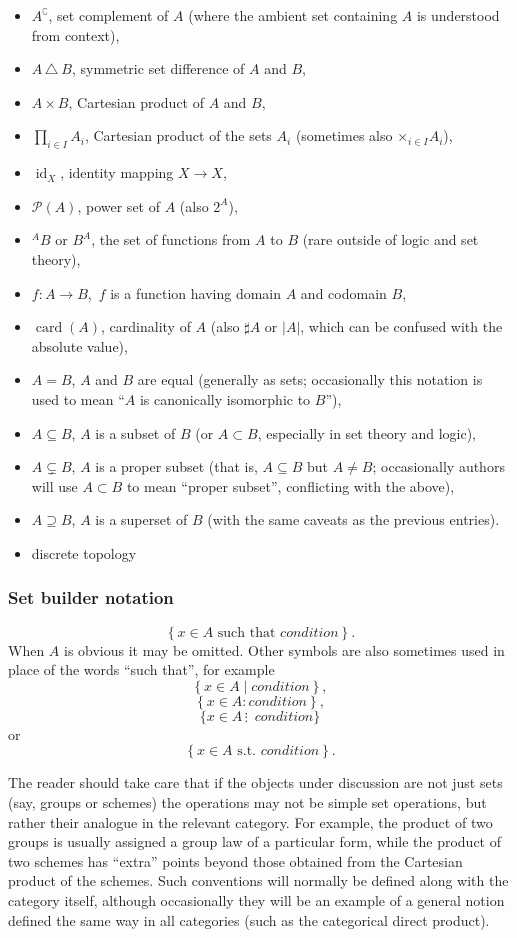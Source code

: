 \documentclass[12pt]{article}
\begin{document}
\begin{itemize}
\item $A^\complement$, set complement of $A$ (where the ambient 
set containing $A$ is understood from context),
\item $A\,\triangle\ B$, symmetric set difference of $A$ and $B$,
\item $A\times B$, Cartesian product of $A$ and $B$,
\item $\prod_{i \in I}A_i$, Cartesian product of the sets $A_i$ (sometimes also {\LARGE $\times$}$_{i \in I}A_i$),
\item $\operatorname{id}_X$, identity mapping $X\to X$,
\item $\mathcal{P}(A)$, power set of $A$ (also $2^{A}$),
\item $^AB$ or $B^A$, the set of functions from $A$ to $B$ (rare outside of logic and set theory),
\item $f\colon A\to B$,\, $f$ is a function having domain $A$ and codomain $B$, 
\item $\operatorname{card}(A)$, cardinality of $A$ (also $\sharp A$ or $\left|A\right|$, which can be confused with the absolute value),
\item $A = B$, $A$ and $B$ are equal (generally as sets; occasionally this notation is used to mean ``$A$ is canonically isomorphic to $B$''),
\item $A \subseteq B$, $A$ is a subset of $B$ (or $A\subset B$, especially in set theory and logic),
\item $A \subsetneq B$, $A$ is a proper subset (that is, $A\subseteq B$ but $A\neq B$; occasionally authors will use $A\subset B$ to mean ``proper subset'', conflicting with the above),
\item $A \supseteq B$, $A$ is a superset of $B$ (with the same caveats as the previous entries).
\item discrete topology
\end{itemize}

\subsubsection*{Set builder notation}
\[
\left\{ x\in A \text{ such that }\textit{condition} \right\}.
\]
When $A$ is obvious it may be omitted.  Other symbols are also sometimes used in place of the words ``such that'', for example
\[
\left\{ x\in A \mid \textit{condition} \right\},
\]
\[
\left\{ x\in A : \textit{condition} \right\},
\]
\[
\{ x\in A \,\vdots \,\,\,condition \}
\]
or
\[
\left\{ x\in A \text{ s.t. } \textit{condition}\right\}.
\]

The reader should take care that if the objects under discussion are not just sets (say, groups or schemes) the operations may not be simple set operations, but rather their analogue in the relevant category.  For example, the product of two groups is usually assigned a group law of a particular form, while the product of two schemes has ``extra'' points beyond those obtained from the Cartesian product of the schemes.  Such conventions will normally be defined along with the category itself, although occasionally they will be an example of a general notion defined the same way in all categories (such as the categorical direct product).
\end{document}
